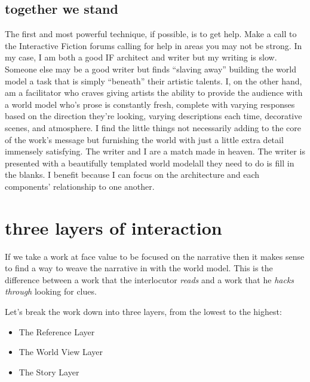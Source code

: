 \subsection{together we stand}
The first and most powerful technique, if possible, is to get help. Make a call
to the Interactive Fiction forums calling for help in areas you may not be
strong. In my case, I am both a good IF architect and writer but my writing is
slow. Someone else may be a good writer but finds ``slaving away'' building the
world model a task that is simply ``beneath'' their artistic talents.
I, on the other hand, am a facilitator who craves giving artists the ability to
provide the audience with a world model who's prose is constantly fresh,
complete with varying responses based on the direction they're looking, varying
descriptions each time, decorative scenes, and atmosphere. I find the little
things not necessarily adding to the core of the work's message but
furnishing the world with just a little extra detail immensely
satisfying.  The writer and I are a match made in heaven. The writer is
presented with a beautifully templated world model\textemdash all they need to do is fill in the blanks. I benefit because I can focus on the architecture and each components' relationship to one another.

\section{three layers of interaction}
If we take a work at face value to be focused on the narrative then it makes sense to find a way to weave the narrative in with the world model. This is the difference between a work that the interlocutor \textit{reads} and a work that he \textit{hacks through} looking for clues.


Let's break the work down into three layers, from the lowest to the highest:
\begin{itemize}
  \item{The Reference Layer}
  \item{The World View Layer}
  \item{The Story Layer}
\end{itemize}


